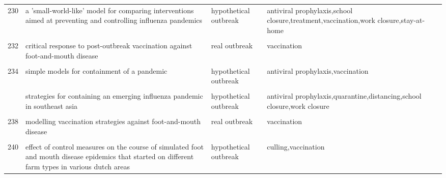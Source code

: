 \documentclass[
]{article}
\begin{document}
\begin{landscape}
\begin{longtable}{l>{\raggedright\arraybackslash}p{3cm}l>{\raggedright\arraybackslash}p{8cm}}
230 & a 'small-world-like' model for comparing interventions aimed at preventing and controlling influenza pandemics & hypothetical outbreak & antiviral prophylaxis,school closure,treatment,vaccination,work closure,stay-at-home\\
\addlinespace
\cellcolor{gray!6}{231} & \cellcolor{gray!6}{containing pandemic influenza with antiviral agents: analytical commentary} & \cellcolor{gray!6}{hypothetical outbreak} & \cellcolor{gray!6}{antiviral prophylaxis,vaccination}\\
232 & critical response to post-outbreak vaccination against foot-and-mouth disease & real outbreak & vaccination\\
\cellcolor{gray!6}{233} & \cellcolor{gray!6}{mitigation strategies for pandemic influenza in the united states} & \cellcolor{gray!6}{hypothetical outbreak} & \cellcolor{gray!6}{antiviral prophylaxis,distancing,school closure,travel restriction,vaccination}\\
234 & simple models for containment of a pandemic & hypothetical outbreak & antiviral prophylaxis,vaccination\\
\cellcolor{gray!6}{235} & \cellcolor{gray!6}{statistical inference in a stochastic epidemic seir model with control intervention: ebola as a case study} & \cellcolor{gray!6}{real outbreak} & \cellcolor{gray!6}{interventions to reduce transmission}\\
\addlinespace
236 & strategies for containing an emerging influenza pandemic in southeast asia & hypothetical outbreak & antiviral prophylaxis,quarantine,distancing,school closure,work closure\\
\cellcolor{gray!6}{237} & \cellcolor{gray!6}{modeling alternative mitigation strategies for a hypothetical outbreak of foot-and-mouth disease in the united states} & \cellcolor{gray!6}{hypothetical outbreak} & \cellcolor{gray!6}{culling,vaccination}\\
238 & modelling vaccination strategies against foot-and-mouth disease & real outbreak & vaccination\\
\cellcolor{gray!6}{239} & \cellcolor{gray!6}{a decision-tree to optimise control measures during the early stage of a foot-and-mouth disease epidemic} & \cellcolor{gray!6}{hypothetical outbreak} & \cellcolor{gray!6}{culling,vaccination,stomping out,movement control}\\
240 & effect of control measures on the course of simulated foot and mouth disease epidemics that started on different farm types in various dutch areas & hypothetical outbreak & culling,vaccination\\

\end{longtable}
\end{landscape}
\end{document}
